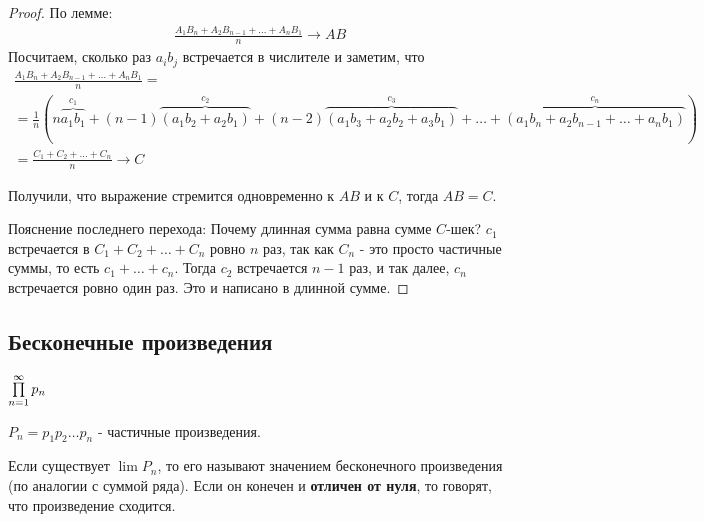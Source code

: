 \begin{proof}
     
    По лемме:
    \begin{gather*}
     \frac{A_1B_n + A_2B_{n-1} + \ldots + A_nB_1}{n} \longrightarrow AB
    \end{gather*}
    Посчитаем, сколько раз $a_ib_j$ встречается в числителе и заметим, что 
    \begin{gather*}
        \frac{A_1B_n + A_2B_{n-1} + \ldots + A_nB_1}{n} = \\
        = \frac{1}{n} ( n\overbrace{a_1b_1}^{c_1} 
        + (n-1)\overbrace{(a_1b_2 + a_2b_1)}^{c_2} 
        + (n-2)\overbrace{(a_1b_3+a_2b_2+a_3b_1)}^{c_3} + \ldots + 
         \overbrace{(a_1b_n + a_2b_{n-1} + \ldots + a_nb_1)}^{c_n} ) \\
        = \frac{C_1 + C_2 + \ldots + C_n}{n} \to C
    \end{gather*}

    Получили, что выражение стремится одновременно к $AB$ и к $C$, тогда $AB = C$. 

    Пояснение последнего перехода: Почему длинная сумма равна сумме $C$-шек? 
    $c_1$ встречается в $C_1 + C_2 + \ldots + C_n$ ровно $n$ раз, так как $C_n$ - это просто 
    частичные суммы, то есть $c_1 + \ldots + c_n$. Тогда $c_2$ встречается $n-1$ раз, и так далее, $c_n$ встречается ровно один раз.
     Это и написано в длинной сумме.


\end{proof}

\subsection{Бесконечные произведения}

\begin{conj}
    $\prod \limits_{n=1}^\infty p_n$

    $P_n = p_1p_2 \ldots p_n$ - частичные произведения.

    Если существует $\lim P_n$, то его называют значением бесконечного произведения (по аналогии с суммой ряда).
    Если он конечен и \textbf{отличен от нуля}, то говорят, что произведение сходится.
\end{conj}

